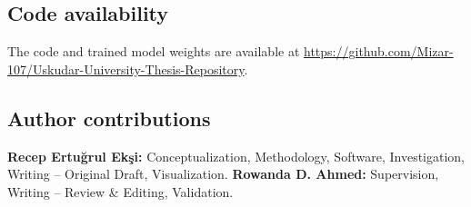 \documentclass[pdflatex,sn-mathphys-num,Numbered]{sn-jnl}
\begin{document}
\begin{declarations}
\subsection*{Code availability}
The code and trained model weights are available at \url{https://github.com/Mizar-107/Uskudar-University-Thesis-Repository}.

\subsection*{Author contributions}
\textbf{Recep Ertu\u{g}rul Ek\c{s}i:} Conceptualization, Methodology, Software, Investigation, Writing -- Original Draft, Visualization. \textbf{Rowanda D. Ahmed:} Supervision, Writing -- Review \& Editing, Validation.

\end{declarations}




\end{document}
